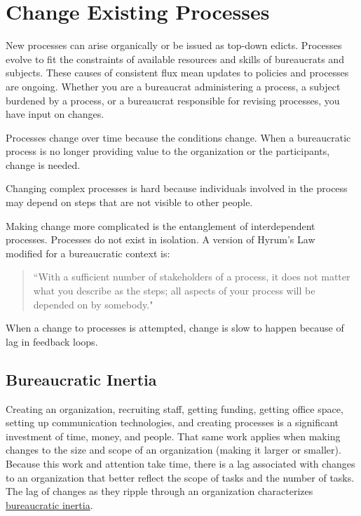 \section{Change Existing Processes\label{sec:change-a-process}}

New processes can arise organically or be issued as top-down edicts. Processes evolve to fit the constraints of available resources and skills of bureaucrats and subjects. These causes of consistent flux mean updates to policies and processes are ongoing. Whether you are a bureaucrat administering a process, a subject burdened by a process, or a bureaucrat responsible for revising processes, you have input on changes.



Processes change over time because the conditions change. When a bureaucratic process is no longer providing value to the organization or the participants, change is needed. 

Changing complex processes is hard because individuals involved in the process may depend on steps that are not visible to other people.

Making change more complicated is the entanglement of interdependent processes. Processes do not exist in isolation. A version of Hyrum's Law~\cite{2017_Hyrum} 
modified for a bureaucratic context is:
\begin{quote}
``With a sufficient number of stakeholders of a process,
it does not matter what you describe as the steps;
all aspects of your process will be depended on by somebody."
\end{quote}


When  a change to processes is attempted, change is slow to happen because of lag in feedback loops. 

\subsection*{Bureaucratic Inertia}

Creating an organization, recruiting staff, getting funding, getting office space, setting up communication technologies, and creating processes is a significant investment of time, money, and people. 
That same work applies when making changes to the size and scope of an organization (making it larger or smaller). 
Because this work and attention take time, there is a lag associated with changes to an organization that better reflect the scope of tasks and the number of tasks. 
The lag of changes as they ripple through an organization characterizes \href{https://en.wikipedia.org/wiki/Bureaucratic_inertia}{bureaucratic inertia}. 

